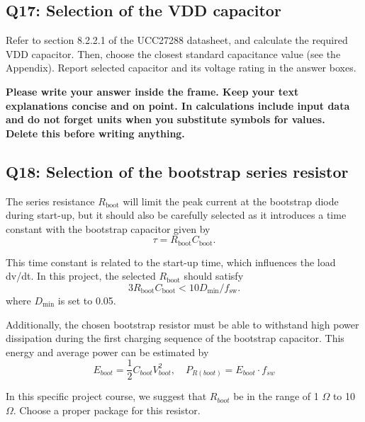 \documentclass{PELsmallreport}
\begin{document}
\subsection{Q17: Selection of the VDD capacitor}
Refer to section 8.2.2.1 of the UCC27288 datasheet, and calculate the required VDD capacitor. Then, choose the closest standard capacitance value (see the Appendix). Report selected capacitor and its voltage rating in the answer boxes.
\begin{framed}
	\vspace{2em}
	\textbf{Please write your answer inside the frame. Keep your text explanations concise and on point. In calculations include input data and do not forget units when you substitute symbols for values. \\ Delete this before writing anything.}
	\vspace{2em}
\end{framed}
 \quad {} \hfill {}

\subsection{Q18: Selection of the bootstrap series resistor}
The series resistance $R_\text{boot}$ will limit the peak current at the bootstrap diode during start-up, but it should also be carefully selected as it introduces a time constant with the bootstrap capacitor given by
\begin{equation}
    \tau = R_\text{boot}C_\text{boot}.
\end{equation}

This time constant is related to the start-up time, which influences the load dv/dt. In this project, the selected $R_\text{boot}$ should satisfy  
\begin{equation}
    3 R_\text{boot}C_\text{boot} < 10 D_\text{min}/f_\text{sw}.
\end{equation}
where $D_\text{min}$ is set to 0.05.

Additionally, the chosen bootstrap resistor must be able to withstand high power dissipation during the first charging sequence of the bootstrap capacitor. This energy and average power can be estimated by
\begin{equation}
    E_{boot} = \frac{1}{2}C_{boot}V_{boot}^2, \quad P_{R(boot)} =E_{boot} \cdot f_{sw}
\end{equation}

In this specific project course, we suggest that $R_{boot}$ be in the range of 1 $\Omega$ to 10 $\Omega$. Choose a proper package for this resistor.\\
\end{document}
